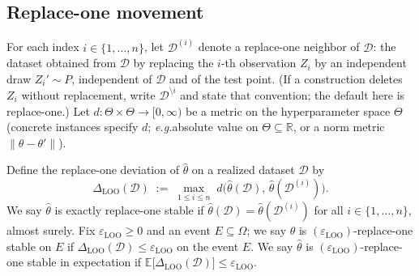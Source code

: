 \documentclass[12pt]{article}
\theoremstyle{plain}
\newcommand*{\eg}{\emph{e.g.}{}}
\begin{document}
\subsection{Replace-one movement}
\label{sec:loo}

\label{def:D-loo}
For each index $i\in\{1,\dots,n\}$, let $\mathcal{D}^{(i)}$ denote a replace-one neighbor of $\mathcal{D}$: the dataset obtained from $\mathcal{D}$ by replacing the $i$-th observation $Z_i$ by an independent draw $Z_i'\sim P$, independent of $\mathcal{D}$ and of the test point.
(If a construction deletes $Z_i$ without replacement, write $\mathcal{D}^{\setminus i}$ and state that convention; the default here is replace-one.)
\label{def:d-Theta}
Let $d:\Theta\times\Theta\to[0,\infty)$ be a metric on the hyperparameter space $\Theta$ (concrete instances specify $d$; \eg absolute value on $\Theta\subseteq\mathbb{R}$, or a norm metric $\|\theta-\theta'\|$).

\label{def:Delta-LOO}
Define the replace-one deviation of $\hat\theta$ on a realized dataset $\mathcal{D}$ by
\begin{equation}
  \label{eq:Delta-LOO}
  \Delta_{\mathrm{LOO}}(\mathcal{D})
  \;:=\;
  \max_{1\le i\le n}
  \;
  d\bigl(\hat\theta(\mathcal{D}),\,\hat\theta(\mathcal{D}^{(i)})\bigr).
\end{equation}
\label{def:exact-LOO}
We say $\hat\theta$ is exactly replace-one stable if
$\hat\theta(\mathcal{D})=\hat\theta(\mathcal{D}^{(i)})$ for all $i\in\{1,\dots,n\}$, almost surely.
\label{def:bounded-LOO}
Fix $\varepsilon_{\mathrm{LOO}}\ge 0$ and an event $E\subseteq\Omega$; we say $\hat\theta$ is $(\varepsilon_{\mathrm{LOO}})$-replace-one stable on $E$ if $\Delta_{\mathrm{LOO}}(\mathcal{D})\le\varepsilon_{\mathrm{LOO}}$ on the event $E$.
\label{def:expected-LOO}
We say $\hat\theta$ is $(\varepsilon_{\mathrm{LOO}})$-replace-one stable in expectation if $\mathbb{E}\bigl[\Delta_{\mathrm{LOO}}(\mathcal{D})\bigr]\le\varepsilon_{\mathrm{LOO}}$.
\end{document}

